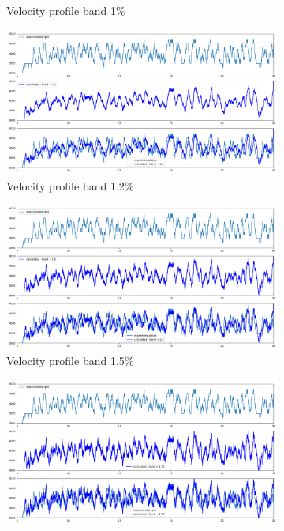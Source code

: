 \documentclass[10pt,fleqn,a4paper,twoside]{article}
\begin{document}
\begin{figure}[H]
\begin{subfigure}{0.4\textwidth}
            \caption{Velocity profile band 1\%}
            \label{fig:fourth}
        \end{subfigure}
        \centering
        \hfill
        \begin{subfigure}{0.4\textwidth}
            \includegraphics[width=\textwidth]{Figures/rpm_analysis_mic4_band_1.2.png}
            \caption{Velocity profile band 1.2\%}
            \label{fig:fifth}
        \end{subfigure}
        \centering
        \hfill
        \begin{subfigure}{0.4\textwidth}
            \includegraphics[width=\textwidth]{Figures/rpm_analysis_mic4_band_1.5.png}
            \caption{Velocity profile band 1.5\%}
            \label{fig:sixth}
        \end{subfigure}
        \centering
        \hfill
        \begin{subfigure}{0.4\textwidth}
            \includegraphics[width=\textwidth]{Figures/rpm_analysis_mic4_band_1.75.png}

\end{subfigure}
\end{figure}
\end{document}
